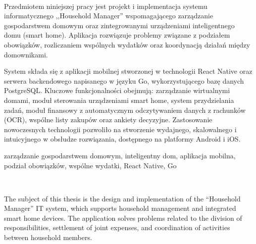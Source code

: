 %


\begin{center}
\\[1cm] 
\end{center}

   Przedmiotem niniejszej pracy jest projekt i implementacja systemu informatycznego ,,Household Manager'' wspomagającego zarządzanie gospodarstwem domowym oraz zintegrowanymi urządzeniami inteligentnego domu (smart home). Aplikacja rozwiązuje problemy związane z podziałem obowiązków, rozliczaniem wspólnych wydatków oraz koordynacją działań między domownikami.

System składa się z aplikacji mobilnej stworzonej w technologii React Native oraz serwera backendowego napisanego w języku Go, wykorzystującego bazę danych PostgreSQL. Kluczowe funkcjonalności obejmują: zarządzanie wirtualnymi domami, moduł sterowania urządzeniami smart home, system przydzielania zadań, moduł finansowy z automatycznym odczytywaniem danych z rachunków (OCR), wspólne listy zakupów oraz ankiety decyzyjne. Zastosowanie nowoczesnych technologii pozwoliło na stworzenie wydajnego, skalowalnego i intuicyjnego w obsłudze rozwiązania, dostępnego na platformy Android i iOS.

\vspace{10pt}
 zarządzanie gospodarstwem domowym, inteligentny dom, aplikacja mobilna, podział obowiązków, wspólne wydatki, React Native, Go

\vfill

\begin{center}
\\[1cm] 
\end{center}

The subject of this thesis is the design and implementation of the “Household Manager” IT system, which supports household management and integrated smart home devices. The application solves problems related to the division of responsibilities, settlement of joint expenses, and coordination of activities between household members.

